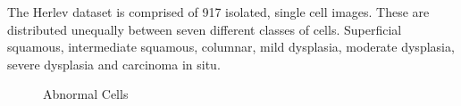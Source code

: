 \documentclass[ms,electronic,oneside,twosidetoc,letterpaper,chaptercenter,parttop]{byumsphd}
\begin{document}
The Herlev dataset is comprised of 917 isolated, single cell images. These are distributed unequally between seven different classes of cells. 
Superficial squamous, intermediate squamous, columnar, mild dysplasia, moderate dysplasia, severe dysplasia and carcinoma in situ.\cite{herlev}

\begin{figure}[H]
  \centering
   \quad
   \quad
   \quad
  \caption{Abnormal Cells}
\end{figure}
\end{document}
